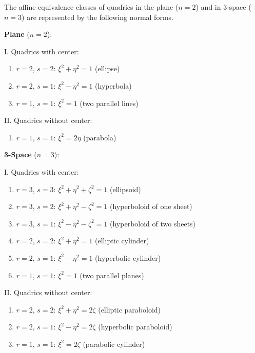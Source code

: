 The affine equivalence classes of quadrics in the plane ($n=2$) and in 3-space ($n=3$) are represented by the following normal forms.

\textbf{Plane} ($n=2$):

I. Quadrics with center:
\begin{enumerate}
\item $r=2$, $s=2$: $\xi^2 + \eta^2 = 1$ (ellipse)
\item $r=2$, $s=1$: $\xi^2 - \eta^2 = 1$ (hyperbola)
\item $r=1$, $s=1$: $\xi^2 = 1$ (two parallel lines)
\end{enumerate}

II. Quadrics without center:
\begin{enumerate}
\item $r=1$, $s=1$: $\xi^2 = 2\eta$ (parabola)
\end{enumerate}

\textbf{3-Space} ($n=3$):

I. Quadrics with center:
\begin{enumerate}
\item $r=3$, $s=3$: $\xi^2 + \eta^2 + \zeta^2 = 1$ (ellipsoid)
\item $r=3$, $s=2$: $\xi^2 + \eta^2 - \zeta^2 = 1$ (hyperboloid of one sheet)
\item $r=3$, $s=1$: $\xi^2 - \eta^2 - \zeta^2 = 1$ (hyperboloid of two sheets)
\item $r=2$, $s=2$: $\xi^2 + \eta^2 = 1$ (elliptic cylinder)
\item $r=2$, $s=1$: $\xi^2 - \eta^2 = 1$ (hyperbolic cylinder)
\item $r=1$, $s=1$: $\xi^2 = 1$ (two parallel planes)
\end{enumerate}

II. Quadrics without center:
\begin{enumerate}
\item $r=2$, $s=2$: $\xi^2 + \eta^2 = 2\zeta$ (elliptic paraboloid)
\item $r=2$, $s=1$: $\xi^2 - \eta^2 = 2\zeta$ (hyperbolic paraboloid)
\item $r=1$, $s=1$: $\xi^2 = 2\zeta$ (parabolic cylinder)
\end{enumerate}
